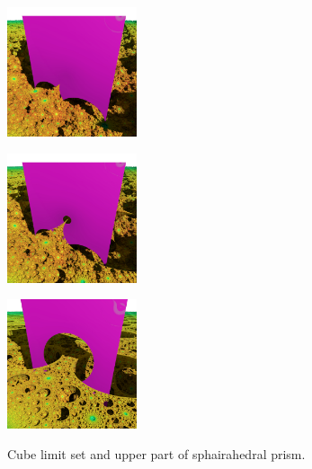 \documentclass[suppldata, dvipdfmx]{interact}
\theoremstyle{plain}%
\theoremstyle{definition}
\theoremstyle{remark}
\theoremstyle{problemstyle}
\begin{document}
\begin{figure}[h!tbp]
 \begin{minipage}[t]{0.3\textwidth}
  \centering
  \includegraphics[width=1.5in, keepaspectratio]{./img/visualization/cubePrism.jpg}
  \subcaption{}
  \label{fig:upperPrism}
 \end{minipage}
 \hspace*{\fill}
 \begin{minipage}[t]{0.3\textwidth}
  \centering
  \includegraphics[width=1.5in, keepaspectratio]{./img/visualization/cubeSmallHole.jpg}
  \subcaption{}
  \label{fig:upperPrismSmallHole}
  \end{minipage}
 \hspace*{\fill}
 \begin{minipage}[t]{0.3\textwidth}
  \centering
  \includegraphics[width=1.5in, keepaspectratio]{./img/visualization/cubeHole.jpg}
  \subcaption{}
  \label{fig:upperPrismBigHole}
 \end{minipage}
 \hspace*{\fill}
 \caption{Cube limit set and upper part of sphairahedral prism.}
 \label{fig:cubeHole}
\end{figure}
\end{document}
